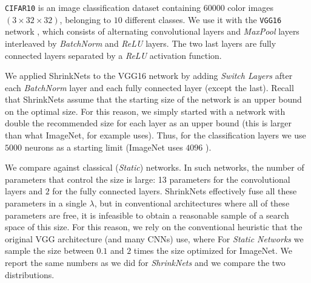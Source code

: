 \texttt{CIFAR10} is an image classification dataset containing $60000$ color
images $(3 \times 32 \times 32)$, belonging to $10$ different classes. We use it
with the \texttt{VGG16} network \cite{Srivastava2014}, which consists of
alternating convolutional layers and \textit{MaxPool} layers interleaved by
\textit{BatchNorm} \cite{DBLP:journals/corr/IoffeS15} and \textit{ReLU}
\cite{Nair2010}  layers.  The two last layers are fully connected layers
separated by a \textit{ReLU} activation function.


We applied ShrinkNets to the VGG16 network by adding \textit{Switch Layers}
after each \textit{BatchNorm} layer and each fully connected layer (except the
last).  Recall that ShrinkNets assume that the starting size of the network is
an upper bound on the optimal size. For this reason, we simply started with a
network with double the recommended size for each layer as an upper bound (this
is larger than what ImageNet, for example uses). Thus, for the classification
layers we use $5000$ neurons as a starting limit (ImageNet uses $4096$ ).

We compare against classical (\textit{Static}) networks. In such networks, the
number of parameters that control the size is large: 13 parameters for the
convolutional layers and $2$ for the fully connected layers. ShrinkNets
effectively fuse all these parameters in a single $\lambda$, but in conventional
architectures where all of these parameters are free, it is infeasible to obtain
a reasonable sample of a search space of this size. For this reason, we rely on
the conventional heuristic that the original VGG architecture (and many CNNs)
 use, where
 For
\textit{Static Networks} we sample the size between $0.1$ and $2$ times the size
 optimized for ImageNet.  We report the same numbers as we did for
\textit{ShrinkNets} and we compare the two distributions. 

